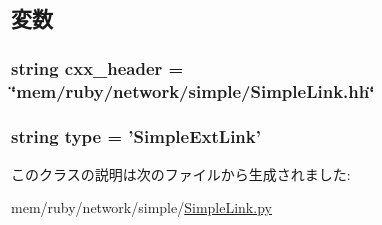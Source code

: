 \subsection{変数}
\hypertarget{classSimpleLink_1_1SimpleExtLink_a17da7064bc5c518791f0c891eff05fda}{
\subsubsection[{cxx\_\-header}]{\setlength{\rightskip}{0pt plus 5cm}string {\bf cxx\_\-header} = \char`\"{}mem/ruby/network/simple/SimpleLink.hh\char`\"{}}}
\label{classSimpleLink_1_1SimpleExtLink_a17da7064bc5c518791f0c891eff05fda}
\hypertarget{classSimpleLink_1_1SimpleExtLink_acce15679d830831b0bbe8ebc2a60b2ca}{
\subsubsection[{type}]{\setlength{\rightskip}{0pt plus 5cm}string {\bf type} = '{\bf SimpleExtLink}'}}
\label{classSimpleLink_1_1SimpleExtLink_acce15679d830831b0bbe8ebc2a60b2ca}


このクラスの説明は次のファイルから生成されました:\begin{DoxyCompactItemize}
\item 
mem/ruby/network/simple/\hyperlink{SimpleLink_8py}{SimpleLink.py}\end{DoxyCompactItemize}
